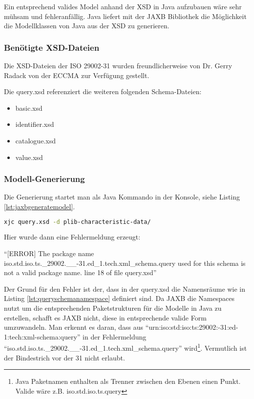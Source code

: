 Ein entsprechend valides Model anhand der XSD in Java aufzubauen wäre sehr mühsam und fehleranfällig. Java liefert mit der JAXB Bibliothek die Möglichkeit die Modellklassen von Java aus der XSD zu generieren.

\subsubsection{Benötigte XSD-Dateien}

Die XSD-Dateien der ISO 29002-31 wurden freundlicherweise von Dr. Gerry Radack von der ECCMA zur Verfügung gestellt. 

Die query.xsd referenziert die weiteren folgenden Schema-Dateien:
\begin{itemize}
\item basic.xsd
\item identifier.xsd
\item catalogue.xsd
\item value.xsd
\end{itemize}
 
\subsubsection{Modell-Generierung}

Die Generierung startet man als Java Kommando in der Konsole, siehe Listing \ref{lst:jaxbgeneratemodel}.

\begin{lstlisting}[caption=JAXB Modellgenerierung von der Konsole, language=sh, label=lst:jaxbgeneratemodel]
xjc query.xsd -d plib-characteristic-data/ 
\end{lstlisting}

Hier wurde dann eine Fehlermeldung erzeugt:

\enquote{[ERROR] The package name iso.std.iso.ts.\_29002.\_\_-31.ed\_1.tech.xml\_schema.query used for this schema is not a valid package name. line 18 of file query.xsd}
  
Der Grund für den Fehler ist der, dass in der query.xsd die Namensräume wie in Listing  \ref{lst:queryschemanamespace} definiert sind. Da JAXB die Namespaces nutzt um die entsprechenden Paketstrukturen für die Modelle in Java zu erstellen, schafft es JAXB nicht, diese in entsprechende valide Form umzuwandeln. Man erkennt es daran, dass aus \enquote{urn:iso:std:iso:ts:29002:-31:ed-1:tech:xml-schema:query} in der Fehlermeldung \enquote{iso.std.iso.ts.\_29002.\_\_-31.ed\_1.tech.xml\_schema.query} wird\footnote{Java Paketnamen enthalten als Trenner zwischen den Ebenen einen Punkt. Valide wäre z.B. iso.std.iso.ts.query}. Vermutlich ist der Bindestrich vor der 31 nicht erlaubt.  

